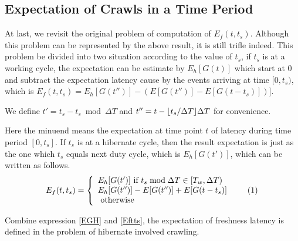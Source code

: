 \documentclass[conference]{IEEEtran}
\newcommand\numberthis{\addtocounter{equation}{1}\tag{\theequation}}
\DeclarePairedDelimiter\floor{\lfloor}{\rfloor}
\begin{document}
\subsection{Expectation of Crawls in a Time Period}

At last, we revisit the original problem of computation of $E_f(t,t_s)$. Although this problem can be represented by the above result, it is still trifle indeed. 
This problem be divided into two situation according to the value of $t_s$, if $t_s$ is at a working cycle, the expectation can be estimate by $E_h[G(t)]$ which start at $0$ and subtract the expectation latency cause by the events arriving at time $[0, t_s)$, which is $E_f(t,t_s)=E_h[G(t'')]-(E[G(t'')]-E[G(t-t_s)])]$. 

We define $t'=t_s-t_s\bmod\Delta T$ and $t''=t-\floor{t_s/\Delta T}\Delta T$ for convenience.

Here the minuend means the expectation at time point $t$ of latency during time period $[0, t_s]$.
If $t_s$ is at a hibernate cycle, then the result expectation is just as the one which $t_s$ equals next duty cycle, which is $E_h[G(t')]$, which can be written as follows.
\[E_f(t,t_s)=\left\{
    \begin{array}{lr}
    E_h[G(t')]\text{ if } t_s\bmod\Delta T\in [T_w, \Delta T)\\
    E_h[G(t'')]-E[G(t'')]+E[G(t-t_s)]\\
    \text{ otherwise }
    \end{array}\numberthis \label{Eftts}
    \right.
\]


Combine expression \eqref{EGH} and \eqref{Eftts}, the expectation of freshness latency is defined in the problem of hibernate involved crawling.
\end{document}
